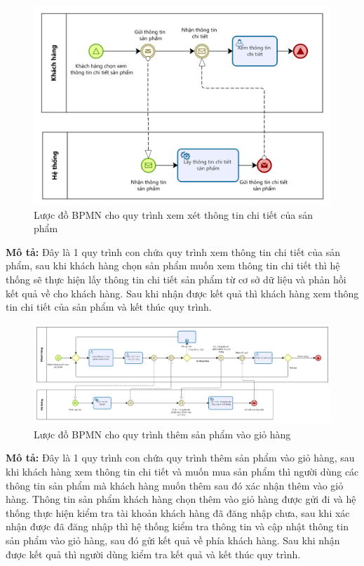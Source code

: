 \begin{figure}[!htp]
	\centering
	\includegraphics[width=12cm]{img/BPMN/customer_buy/customer_product_detail.png}
	\newline
	\caption{Lược đồ BPMN cho quy trình xem xét thông tin chi tiết của sản phẩm}
\end{figure}
\textbf{Mô tả:} Đây là 1 quy trình con chứa quy trình xem thông tin chi tiết của sản phẩm, sau khi khách hàng chọn sản phẩm muốn xem thông tin chi tiết thì hệ thống sẽ thực hiện lấy thông tin chi tiết sản phẩm từ cơ sở dữ liệu và phản hồi kết quả về cho khách hàng. Sau khi nhận được kết quả thì khách hàng xem thông tin chi tiết của sản phẩm và kết thúc quy trình.

\begin{figure}[!htp]
	\centering
	\includegraphics[width=15cm]{img/BPMN/customer_buy/customer_add_to_card.png}
	\newline
	\caption{Lược đồ BPMN cho quy trình thêm sản phẩm vào giỏ hàng}
\end{figure}
\textbf{Mô tả:} Đây là 1 quy trình con chứa quy trình thêm sản phẩm vào giỏ hàng, sau khi khách hàng xem thông tin chi tiết và muốn mua sản phẩm thì người dùng các thông tin sản phẩm mà khách hàng muốn thêm sau đó xác nhận thêm vào giỏ hàng. Thông tin sản phẩm khách hàng chọn thêm vào giỏ hàng được gửi đi và hệ thống thực hiện kiểm tra tài khoản khách hàng đã đăng nhập chưa, sau khi xác nhận được đã đăng nhập thì hệ thống kiểm tra thông tin và cập nhật thông tin sản phẩm vào giỏ hàng, sau đó gửi kết quả về phía khách hàng. Sau khi nhận được kết quả thì người dùng kiểm tra kết quả và kết thúc quy trình.

